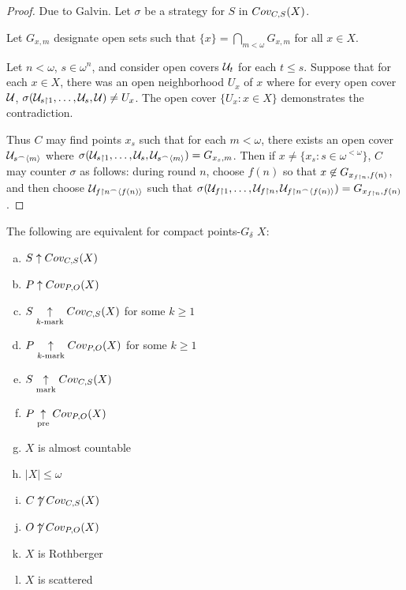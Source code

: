   \begin{proof}

    Due to Galvin. Let $\sigma$ be a strategy for $S$ in $Cov_{C,S}(X)$.

    Let $G_{x,m}$ designate open sets such that $\{x\}=\bigcap_{m<\omega}G_{x,m}$ for all $x\in X$.

    Let $n<\omega$, $s\in\omega^{n}$, and consider open covers $\mathcal{U}_t$ for each $t\leq s$. Suppose that for each $x\in X$, there was an open neighborhood $U_x$ of $x$ where for every open cover $\mathcal{U}$, $\sigma(\mathcal{U}_{s\restriction 1},\dots,\mathcal{U}_{s},\mathcal{U})\not=U_x$. The open cover $\{U_x : x\in X\}$ demonstrates the contradiction.

    Thus $C$ may find points $x_s$ such that for each $m<\omega$, there exists an open cover $\mathcal{U}_{s{^\frown}\langle m\rangle}$ where $\sigma(\mathcal{U}_{s\restriction 1},\dots,\mathcal{U}_{s},\mathcal{U}_{s{^\frown}\langle m\rangle})=G_{x_s,m}$. Then if $x\not=\{x_s : s\in\omega^{<\omega}\}$, $C$ may counter $\sigma$ as follows: during round $n$, choose $f(n)$ so that $x\not\in G_{x_{f\restriction n},f(n)}$, and then choose $\mathcal{U}_{f\restriction n{^\frown}\langle f(n)\rangle}$ such that $\sigma(\mathcal{U}_{f\restriction 1},\dots,\mathcal{U}_{f\restriction n},\mathcal{U}_{f\restriction n{^\frown}\langle f(n)\rangle})=G_{x_{f\restriction n},f(n)}$.
  \end{proof} 

  \begin{corollary}
    The following are equivalent for compact points-$G_\delta$ $X$:
      \begin{enumerate}[(a)]
        \item $S\uparrow Cov_{C,S}(X)$
        \item $P\uparrow Cov_{P,O}(X)$
        \item $S\underset{k\text{-mark}}{\uparrow}Cov_{C,S}(X)$ for some $k\geq 1$
        \item $P\underset{k\text{-mark}}{\uparrow}Cov_{P,O}(X)$ for some $k\geq 1$
        \item $S\underset{\text{mark}}{\uparrow}Cov_{C,S}(X)$
        \item $P\underset{\text{pre}}{\uparrow}Cov_{P,O}(X)$
        \item $X$ is almost countable
        \item $|X|\leq\omega$
        \item $C\not\uparrow Cov_{C,S}(X)$
        \item $O\not\uparrow Cov_{P,O}(X)$
        \item $X$ is Rothberger
        \item $X$ is scattered
      \end{enumerate}
  \end{corollary}

